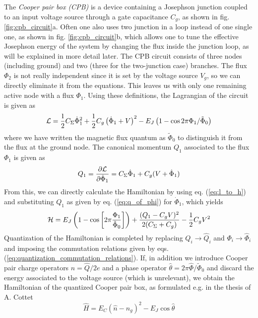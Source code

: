 The {\it Cooper pair box (CPB)} is a device containing a Josephson junction coupled to an input voltage source through a gate capacitance $C_g$, as shown in fig. \ref{fig:cpb_circuit}a. Often one also uses two junction in a loop instead of one single one, as shown in fig. \ref{fig:cpb_circuit}b, which allows one to tune the effective Josephson energy of the system by changing the flux inside the junction loop, as will be explained in more detail later. The CPB circuit consists of  three nodes (including ground) and two (three for the two-junction case) branches. The flux $\Phi_2$ is not really independent since it is set by the voltage source $V_g$, so we can directly eliminate it from the equations. This leaves us with only one remaining active node with a flux $\Phi_1$. Using these definitions, the Lagrangian of the circuit is given as
%
\begin{equation}
\begin{mathcal}L\end{mathcal}=\frac{1}{2}C_\Sigma\dot{\Phi}_1^2+\frac{1}{2}C_g\left(\dot{\Phi}_1+V\right)^2-E_J\left(1-\cos{2\pi\Phi_1/\tilde{\Phi}_0}\right)
\end{equation}
%
where we have written the magnetic flux quantum as $\tilde{\Phi}_0$ to distinguish it from the flux at the ground node. The canonical momentum $Q_1$ associated to the flux $\Phi_1$ is given as
%
\begin{equation}
Q_1 = \frac{\partial \begin{mathcal}L\end{mathcal}}{\partial \dot{\Phi}_1} = C_\Sigma \dot{\Phi}_1+C_g(V+\dot{\Phi}_1) \label{eq:q_of_phi}
\end{equation}
%
From this, we can directly calculate the Hamiltonian by using eq. (\ref{eq:l_to_h}) and substituting $Q_1$ as given by eq. (\ref{eq:q_of_phi}) for $\dot{\Phi}_1$, which yields
%
\begin{equation}
\begin{mathcal}H\end{mathcal} = E_J\left(1-\cos{\left[2\pi\frac{\Phi_1}{\tilde{\Phi}_0}\right]}\right)+\frac{(Q_1-C_g V)^2}{2(C_\Sigma+C_g)}-\frac{1}{2}C_g V^2
\end{equation}
%
Quantization of the Hamiltonian is completed by replacing $Q_i\to \hat{Q}_i$ and $\Phi_i\to\hat{\Phi}_i$ and imposing the commutation relations given by eqs. (\ref{eq:quantization_commutation_relations}). If, in addition we introduce Cooper pair charge operators $\hat{n}=\hat{Q}/2e$ and a phase operator $\hat{\theta}=2\pi\hat{\Phi}/\tilde{\Phi}_0$ and discard the energy associated to the voltage source (which is unrelevant), we obtain the Hamiltonian of the quantized Cooper pair box, as formulated e.g. in the thesis of A. Cottet \citep{cottet_implementation_2002}
%
\begin{equation}
\hat{H} = E_C \left( \hat{n} - n_g\right)^2-E_J \cos{\hat{\theta}}
\end{equation}
%
 

